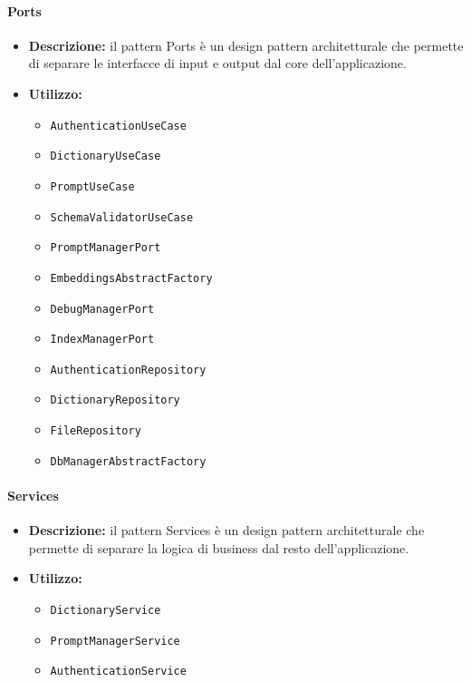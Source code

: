 \paragraph{Ports}
\begin{itemize}
    \item{\textbf{Descrizione:}} il pattern Ports è un design pattern architetturale che permette di separare le interfacce di input e output dal core dell'applicazione.
    \item{\textbf{Utilizzo:}}
    \begin{itemize}
        \item \texttt{AuthenticationUseCase}
        \item \texttt{DictionaryUseCase}
        \item \texttt{PromptUseCase}
        \item \texttt{SchemaValidatorUseCase}
        \item \texttt{PromptManagerPort}
        \item \texttt{EmbeddingsAbstractFactory}
        \item \texttt{DebugManagerPort}
        \item \texttt{IndexManagerPort}
        \item \texttt{AuthenticationRepository}
        \item \texttt{DictionaryRepository}
        \item \texttt{FileRepository}
        \item \texttt{DbManagerAbstractFactory}
    \end{itemize}
\end{itemize}

\paragraph{Services}
\begin{itemize}
    \item{\textbf{Descrizione:}} il pattern Services è un design pattern architetturale che permette di separare la logica di business dal resto dell'applicazione.
    \item{\textbf{Utilizzo:}}
    \begin{itemize}
        \item \texttt{DictionaryService}
        \item \texttt{PromptManagerService}
        \item \texttt{AuthenticationService}
    \end{itemize}
\end{itemize}

